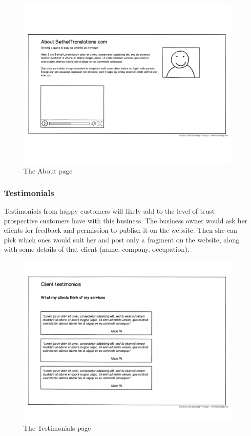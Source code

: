 \documentclass{l3proj}
\begin{document}
\begin{figure}
\label{wireframes:about}
\begin{center}
\includegraphics[width=\linewidth, trim = 0px 110px 0px 100px]{wireframes/about}
\caption{The About page}
\end{center}
\end{figure}


\subsubsection{Testimonials}
Testimonials from happy customers will likely add to the level of trust
prospective customers have with this business.
The business owner would ask her clients for feedback and permission to publish
it on the website. Then she can pick which ones would suit her and post only a
fragment on the website, along with some details of that client (name, company,
occupation).

\begin{figure}
\label{wireframes:testimonials}
\begin{center}
\includegraphics[width=\linewidth, trim = 0px 80px 0px 220px]
	{wireframes/testimonials}
\caption{The Testimonials page}
\end{center}
\end{figure}
\end{document}
